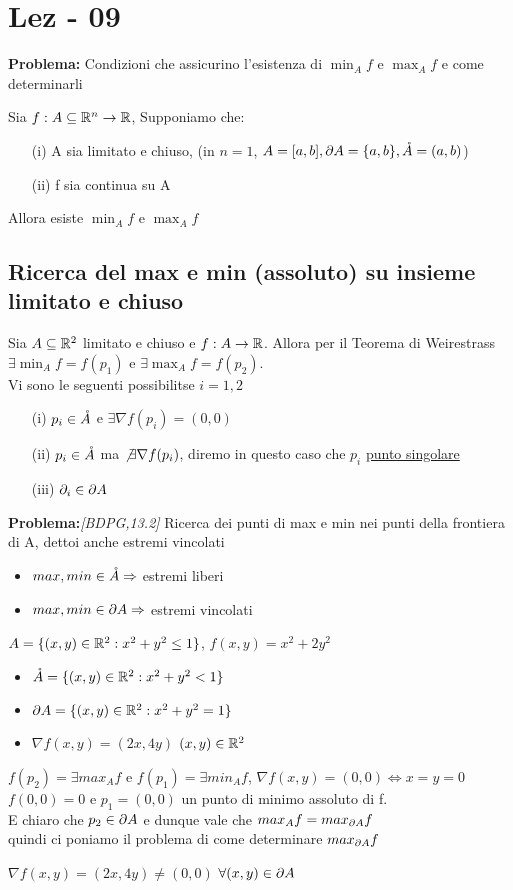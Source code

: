 \section{Lez - 09}
\textbf{Problema:} Condizioni che assicurino l'esistenza di $\min_{A}f$ e $\max_{A}f$ e come determinarli
\begin{theorem}[Weirestrass][BDPG,10.10]
  Sia $f: A \subseteq \mathbb{R}^n \to \mathbb{R}$, Supponiamo che:
  \begin{itemize}
    \item[(i)] A sia limitato e chiuso, (in $n=1$, $A = [a,b], \partial A = \{a,b\}, \mathring{A} = (a,b)$)
    \item[(ii)] f sia continua su A 
  \end{itemize}
  Allora esiste $\min_{A}f$ e $\max_{A}f$
\end{theorem}
\subsection{Ricerca del max e min (assoluto) su insieme limitato e chiuso}
Sia $A \subseteq \mathbb{R}^2$ limitato e chiuso e $f:A \to \mathbb{R}$. Allora per il Teorema di Weirestrass 
$\exists \min_{A}f = f(p_1)$ e $\exists\max_{A}f = f(p_2)$. \\
Vi sono le seguenti possibilit\aca se $i = 1,2$
\begin{itemize}
  \item[(i)] $p_i \in \mathring{A}$ e $\exists \nabla f(p_i) = (0,0)$
  \item[(ii)] $p_i \in \mathring{A}$ ma $\not \exists \nabla f(p_i)$, diremo in questo caso che $p_i$ \ace \underline{punto singolare}
  \item[(iii)] $\partial_i \in \partial A$  
\end{itemize}
\textbf{Problema:}\textit{[BDPG,13.2]}  Ricerca dei punti di max e min nei punti della frontiera di A, dettoi anche estremi vincolati
\begin{itemize}
  \item $max,min \in \mathring{A} \Rightarrow $ estremi liberi
  \item $max,min \in \partial A \Rightarrow $ estremi vincolati
\end{itemize}
\begin{example}\label{para}
  $A = \{(x,y)\in \mathbb{R}^2 : x^2+y^2 \leq 1\}$, $f(x,y) = x^2+2y^2$
  \begin{itemize}
    \item $\mathring{A} = \{(x,y)\in\mathbb{R}^2 : x^2+y^2 < 1\}$
    \item $\partial A = \{(x,y)\in\mathbb{R}^2 : x^2+y^2=1\}$
    \item $\nabla f(x,y) = (2x,4y)$ $(x,y)\in\mathbb{R}^2$
  \end{itemize}
  $f(p_2) = \exists max_{A} f$ e $f(p_1) = \exists min_{A}f$, $\nabla f(x,y)=(0,0) \iff x = y = 0$ 
  $f(0,0) = 0$ e $p_1 = (0,0)$ \ace un punto di minimo assoluto di f. \\
  \ac{E} chiaro che $p_2 \in \partial A$ e dunque vale che $max_{A} f = max_{\partial A}f$ \\
  quindi ci poniamo il problema di come determinare $max_{\partial A}f$
\end{example}
\begin{osservazione}
  $\nabla f(x,y) = (2x,4y) \neq (0,0)$ $\forall (x,y) \in \partial A$
\end{osservazione}
